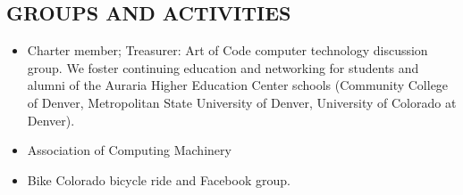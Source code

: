 \documentclass[line,margin]{res}
\begin{document}
\begin{resume}
\section{GROUPS AND ACTIVITIES}        
\begin{itemize}   \itemsep -2pt %
          \item Charter member; Treasurer: Art of Code computer technology discussion group. We foster continuing education and networking for students and alumni of the Auraria Higher Education Center schools (Community College of Denver, Metropolitan State University of Denver, University of Colorado at Denver).
\item	Association of Computing Machinery
\item Bike Colorado bicycle ride and Facebook group.
\end{itemize}
 

\end{resume}
\end{document}
